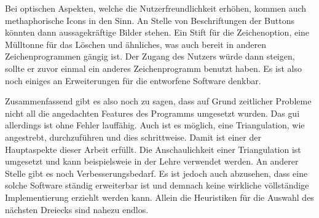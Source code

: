 Bei optischen Aspekten, welche die Nutzerfreundlichkeit erhöhen, kommen auch methaphorische Icons in den Sinn. An Stelle von Beschriftungen der Buttons könnten dann aussagekräftige Bilder stehen.
Ein Stift für die Zeichenoption, eine Mülltonne für das Löschen und ähnliches, was auch bereit in anderen Zeichenprogrammen gängig ist. Der Zugang des Nutzers würde dann steigen, sollte er zuvor einmal ein anderes Zeichenprogramm benutzt haben.
Es ist also noch einiges an Erweiterungen für die entworfene Software denkbar. \linebreak

Zusammenfassend gibt es also noch zu sagen, dass auf Grund zeitlicher Probleme nicht all die angedachten Features des Programms umgesetzt wurden. Das \ac{gui} allerdings ist ohne Fehler lauffähig.
Auch ist es möglich, eine Triangulation, wie angestrebt, durchzuführen und dies schrittweise. Damit ist einer der Hauptaspekte dieser Arbeit erfüllt. Die Anschaulichkeit einer Triangulation ist umgesetzt und kann beispielsweie
in der Lehre verwendet werden.
An anderer Stelle gibt es noch Verbesserungsbedarf. Es ist jedoch auch abzusehen, dass eine solche Software ständig erweiterbar ist und demnach keine wirkliche völlständige Implementierung erziehlt 
werden kann. Allein die Heuristiken für die Auswahl des nächsten Dreiecks sind nahezu endlos. 
